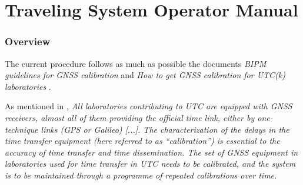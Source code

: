 \documentclass[11pt]{article}
\begin{document}






\newpage
{}
\part{Traveling System Operator Manual}


\section{Overview}

The current procedure follows as much as possible the documents  \textit{BIPM guidelines for GNSS calibration} \cite{guidelines} and \textit{How to get GNSS calibration for UTC(k) laboratories} \cite{getcal}.

As mentioned in \cite{guidelines}, \textit{All laboratories contributing to UTC are equipped with GNSS receivers, almost all of them providing the official time link, either by one-technique links (GPS or Galileo) [...]. The characterization of the delays in the time transfer equipment (here referred to as “calibration”) is essential to
the accuracy of time transfer and time dissemination. The set of GNSS equipment in laboratories used for time
transfer in UTC needs to be calibrated, and the system is to be maintained through a programme of repeated calibrations over time.}
\end{document}

